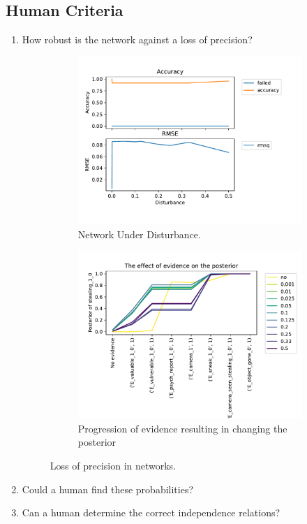 \subsection{Human Criteria}
\begin{enumerate}
\item How robust is the network against a loss of precision?

\begin{figure}[htbp]
\begin{center}
\begin{subfigure}{.5\textwidth}
\includegraphics[width=0.9\linewidth]{../experiments/GroteMarkt/plots/performance_GroteMarkt.pdf}
\caption{Network Under Disturbance.}
\label{dist}
\end{subfigure}%
\begin{subfigure}{.5\textwidth}
\includegraphics[width=0.9\linewidth]{../experiments/GroteMarkt/plots/posterior_GroteMarkt.pdf}
\caption{ Progression of evidence resulting in changing the posterior}
\label{post}
\end{subfigure}
\end{center}
\caption{Loss of precision in networks.}
\end{figure}

\item Could a human find these probabilities?
\item Can a human determine the correct independence relations?
\end{enumerate}





